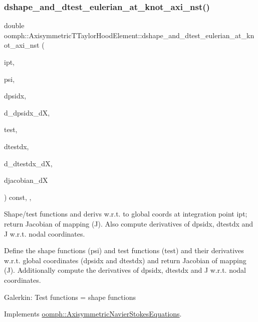 \subsubsection{\texorpdfstring{dshape\+\_\+and\+\_\+dtest\+\_\+eulerian\+\_\+at\+\_\+knot\+\_\+axi\+\_\+nst()}{dshape\_and\_dtest\_eulerian\_at\_knot\_axi\_nst()}\hspace{0.1cm}{\footnotesize\ttfamily [2/2]}}
{\footnotesize\ttfamily double oomph\+::\+Axisymmetric\+T\+Taylor\+Hood\+Element\+::dshape\+\_\+and\+\_\+dtest\+\_\+eulerian\+\_\+at\+\_\+knot\+\_\+axi\+\_\+nst (\begin{DoxyParamCaption}\item[{const unsigned \&}]{ipt,  }\item[{\hyperlink{classoomph_1_1Shape}{Shape} \&}]{psi,  }\item[{\hyperlink{classoomph_1_1DShape}{D\+Shape} \&}]{dpsidx,  }\item[{\hyperlink{classoomph_1_1RankFourTensor}{Rank\+Four\+Tensor}$<$ double $>$ \&}]{d\+\_\+dpsidx\+\_\+dX,  }\item[{\hyperlink{classoomph_1_1Shape}{Shape} \&}]{test,  }\item[{\hyperlink{classoomph_1_1DShape}{D\+Shape} \&}]{dtestdx,  }\item[{\hyperlink{classoomph_1_1RankFourTensor}{Rank\+Four\+Tensor}$<$ double $>$ \&}]{d\+\_\+dtestdx\+\_\+dX,  }\item[{\hyperlink{classoomph_1_1DenseMatrix}{Dense\+Matrix}$<$ double $>$ \&}]{djacobian\+\_\+dX }\end{DoxyParamCaption}) const\hspace{0.3cm}{\ttfamily [inline]}, {\ttfamily [protected]}, {\ttfamily [virtual]}}



Shape/test functions and derivs w.\+r.\+t. to global coords at integration point ipt; return Jacobian of mapping (J). Also compute derivatives of dpsidx, dtestdx and J w.\+r.\+t. nodal coordinates. 

Define the shape functions (psi) and test functions (test) and their derivatives w.\+r.\+t. global coordinates (dpsidx and dtestdx) and return Jacobian of mapping (J). Additionally compute the derivatives of dpsidx, dtestdx and J w.\+r.\+t. nodal coordinates.

Galerkin\+: Test functions = shape functions 

Implements \hyperlink{classoomph_1_1AxisymmetricNavierStokesEquations_a2cd0715a679af81bd0e3d7448a5560cb}{oomph\+::\+Axisymmetric\+Navier\+Stokes\+Equations}.



